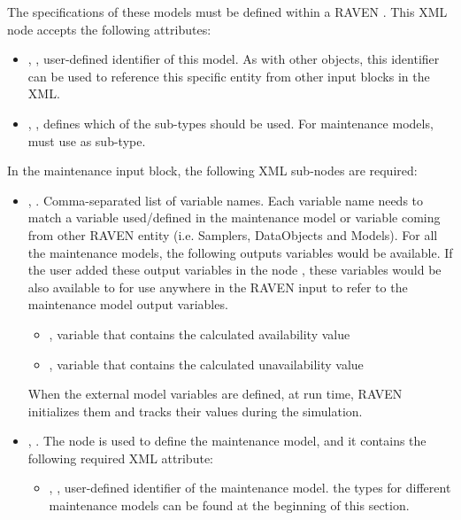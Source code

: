 The specifications of these models must be defined within a RAVEN . This
XML node accepts the following attributes:
\begin{itemize}
	\item {}, , user-defined identifier of this model.
	\nb As with other objects, this identifier can be used to reference this specific entity from other
	input blocks in the XML.
	\item {}, , defines which of the sub-types should
	be used. For maintenance models, must use  as sub-type.
\end{itemize}
In the maintenance  input block, the following XML sub-nodes are required:
\begin{itemize}
	\item {}, . Comma-separated list of variable
	names. Each variable name needs to match a variable used/defined in the maintenance model or variable
	coming from other RAVEN entity (i.e. Samplers, DataObjects and Models).
	\nb For all the maintenance models, the following outputs variables would be available. If the user
	added these output variables in the node , these variables would be also available to
	for use anywhere in the RAVEN input to refer to the maintenance model output variables.
	\begin{itemize}
		\item {}, variable that contains the calculated availability value
		\item {}, variable that contains the calculated unavailability value
	\end{itemize}
	\nb When the external model variables are defined, at run time, RAVEN initializes
	them and tracks their values during the simulation.
	\item {}, . The node is used to define the maintenance
	model, and it contains the following required XML attribute:
	\begin{itemize}
		\item {}, , user-defined identifier of the maintenance model.
		\nb the types for different maintenance models can be found at the beginning of this section.
	\end{itemize}
\end{itemize}
